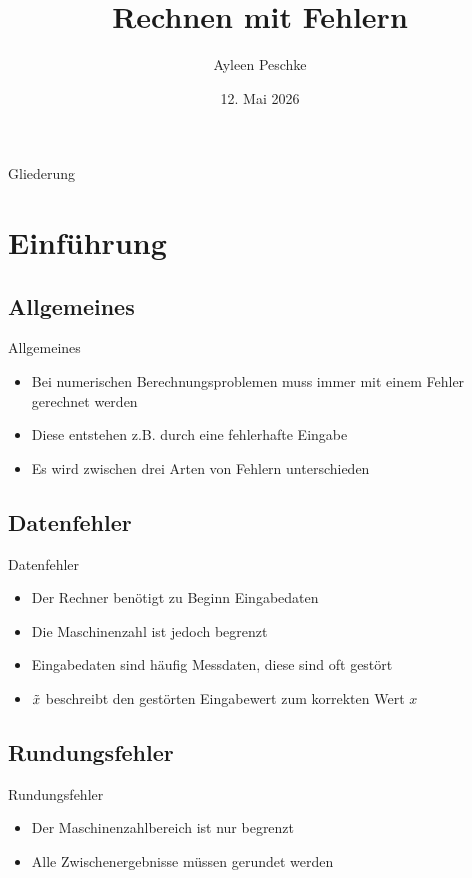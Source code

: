 \documentclass{beamer}
\title{Rechnen mit Fehlern}
\author{Ayleen Peschke}
\date{12. Mai 2026}
\begin{document}
\maketitle

\begin{frame}{Gliederung}
    \tableofcontents[hideallsubsections]
\end{frame}

\section{Einführung}
    \subsection{Allgemeines}
      \begin{frame}{Allgemeines}
         \begin{itemize}
             \item Bei numerischen Berechnungsproblemen muss immer mit einem Fehler gerechnet werden
             \item Diese entstehen z.B. durch eine fehlerhafte Eingabe
             \item Es wird zwischen drei Arten von Fehlern unterschieden
         \end{itemize}
      \end{frame} 

    \subsection{Datenfehler}
      \begin{frame}{Datenfehler}
          \begin{itemize}
              \item Der Rechner benötigt zu Beginn Eingabedaten
              \item Die Maschinenzahl ist jedoch begrenzt
              \item Eingabedaten sind häufig Messdaten, diese sind oft gestört
              \item $\Tilde{x}$ beschreibt den gestörten Eingabewert zum korrekten Wert $x$
          \end{itemize}
      \end{frame}

     \subsection{Rundungsfehler}
       \begin{frame}{Rundungsfehler}
           \begin{itemize}
               \item Der Maschinenzahlbereich ist nur begrenzt
               \item Alle Zwischenergebnisse müssen gerundet werden
           \end{itemize}
       \end{frame}
\end{document}
